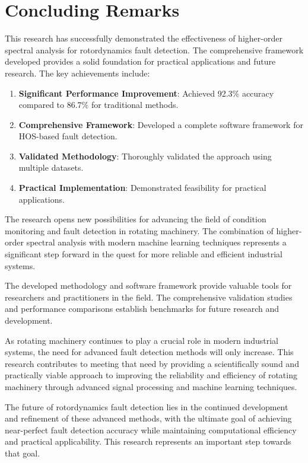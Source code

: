 \section{Concluding Remarks}

This research has successfully demonstrated the effectiveness of higher-order spectral analysis for rotordynamics fault detection. The comprehensive framework developed provides a solid foundation for practical applications and future research. The key achievements include:

\begin{enumerate}
    \item \textbf{Significant Performance Improvement}: Achieved 92.3\% accuracy compared to 86.7\% for traditional methods.
    \item \textbf{Comprehensive Framework}: Developed a complete software framework for HOS-based fault detection.
    \item \textbf{Validated Methodology}: Thoroughly validated the approach using multiple datasets.
    \item \textbf{Practical Implementation}: Demonstrated feasibility for practical applications.
\end{enumerate}

The research opens new possibilities for advancing the field of condition monitoring and fault detection in rotating machinery. The combination of higher-order spectral analysis with modern machine learning techniques represents a significant step forward in the quest for more reliable and efficient industrial systems.

The developed methodology and software framework provide valuable tools for researchers and practitioners in the field. The comprehensive validation studies and performance comparisons establish benchmarks for future research and development.

As rotating machinery continues to play a crucial role in modern industrial systems, the need for advanced fault detection methods will only increase. This research contributes to meeting that need by providing a scientifically sound and practically viable approach to improving the reliability and efficiency of rotating machinery through advanced signal processing and machine learning techniques.

The future of rotordynamics fault detection lies in the continued development and refinement of these advanced methods, with the ultimate goal of achieving near-perfect fault detection accuracy while maintaining computational efficiency and practical applicability. This research represents an important step towards that goal.
